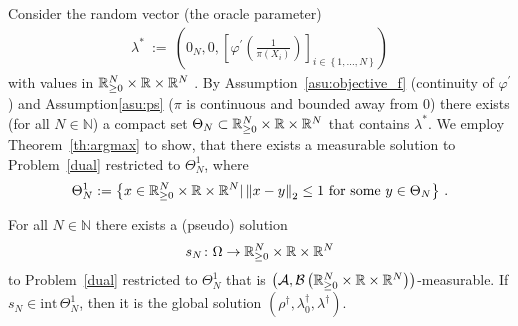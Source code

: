 Consider 
the random vector (the oracle parameter)
\begin{align*}
  \lambda^*
  \ 
  :=
  \ 
  \left(
  0_{N},0,
  \left[
  \varphi^{'}
  \left(
  \frac
  {1}
  {\pi(X_i)}
  \right)
\right]_{i\in \left\{
  1,\ldots,N
\right\}}
  \right)
\end{align*}
with values in 
$\mathbb{R}^N_{\ge 0}\times \mathbb{R}\times \mathbb{R}^N$
.
By Assumption~\ref{asu:objective_f} (continuity of $\varphi^{'}$)
and Assumption\ref{asu:ps} ($\pi$ is continuous and bounded away from 0)
there exists (for all $N\in\mathbb{N}$) a compact set 
$
\Theta_N\subset
\mathbb{R}^N_{\ge 0}\times \mathbb{R}\times \mathbb{R}^N
$
that contains $\lambda^*$. 
We employ Theorem~\ref{th:argmax} to show, that there exists a measurable solution to Problem~\ref{dual} restricted to $\Theta_N^1$,
where 
\begin{align*}
  \Theta_N^1
  :=
  \left\{
    x\in 
\R^N_{\ge 0}\times \R\times \R^N
|
\norm{x-y}_2\le 1
\ 
\text{for some}\ 
y\in\Theta_N
  \right\}
  \,.
\end{align*}
\begin{lemma}
  \label{lem:pseud_sol}
  For all $N\in\mathbb{N}$ there exists a (pseudo) solution
  \begin{align*}
    s_N\colon
    \Omega
    \to
  \mathbb{R}^N_{\ge 0}
  \times
  \mathbb{R}
  \times
  \mathbb{R}^{N}
  \end{align*}
  to
  Problem~\ref{dual} restricted to $\Theta_N^1$ 
  that is
$
  \left(
  \mathcal{A},\mathcal{B}
  \left(
  \mathbb{R}^N_{\ge 0}
  \times
  \mathbb{R}
  \times
  \mathbb{R}^{N}
  \right)
  \right)
$-measurable.
If $s_N\in \mathrm{int}\, \Theta_N^1$, then it is the global solution
  $
  (\rho^\dagger,\lambda_0^\dagger,\lambda^\dagger)
  $.
\end{lemma}
